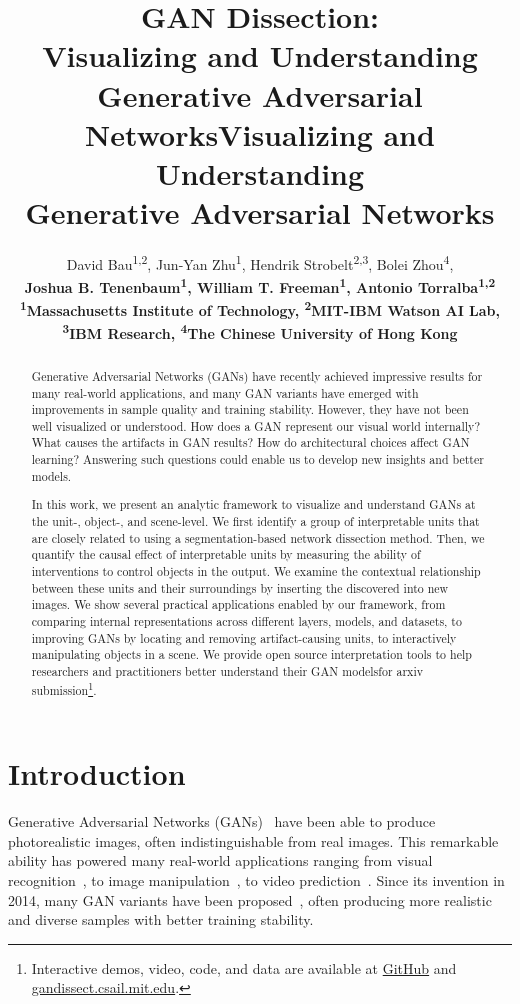 \documentclass{article} %
\title{GAN Dissection: \\ Visualizing and Understanding \\ Generative Adversarial Networks}
\title{Visualizing and Understanding \\ Generative Adversarial Networks}
\author{%
David Bau\textsuperscript{1,2},
Jun-Yan Zhu\textsuperscript{1},
Hendrik Strobelt\textsuperscript{2,3},
Bolei Zhou\textsuperscript{4}, \\
\bf{Joshua B. Tenenbaum}\textsuperscript{1},
\bf{William T. Freeman}\textsuperscript{1},
\bf{Antonio Torralba}\textsuperscript{1,2} \\
\textsuperscript{1}Massachusetts Institute of Technology,
\textsuperscript{2}MIT-IBM Watson AI Lab, \\
\textsuperscript{3}IBM Research,
\textsuperscript{4}The Chinese University of Hong Kong
 }
\author{}
\def\arxiv{for arxiv submission}
\begin{document}
\maketitle

\begin{abstract}
Generative Adversarial Networks (GANs) have recently achieved impressive results for many real-world applications, and many GAN variants have emerged with improvements in sample quality and training stability. However, they have not been well visualized or understood. How does a GAN represent our visual world internally?  What causes the artifacts in GAN results?  How do architectural choices affect GAN learning?  Answering such questions could enable us to develop new insights and better models.

In this work, we present an analytic framework to visualize and understand GANs at the unit-, object-, and scene-level. We first identify a group of interpretable units that are closely related to \concepts using a segmentation-based network dissection method. Then, we quantify the causal effect of interpretable units by measuring the ability of interventions to control objects in the output. We examine the contextual relationship between these units and their surroundings by inserting the discovered \concepts into new images. We show several practical applications enabled by our framework, from comparing internal representations across different layers, models, and datasets, to improving GANs by locating and removing artifact-causing units, to interactively manipulating objects in a scene.  We provide open source interpretation tools to help researchers and practitioners better understand their GAN models\ifdefined\arxiv\footnote{Interactive demos, video, code, and data are available at \href{https://github.com/CSAILVision/gandissect}{GitHub} and \href{https://gandissect.csail.mit.edu}{gandissect.csail.mit.edu}.}\fi.

\end{abstract}
\section{Introduction}
Generative Adversarial Networks (GANs)~\citep{goodfellow2014generative} have been able to produce photorealistic images, often indistinguishable from real images.
This remarkable ability has powered   many real-world applications ranging from visual recognition~\citep{wang2017fast}, to image manipulation~\citep{isola2017image,zhu2017unpaired}, to video prediction~\citep{mathieu2016deep}. Since its invention in 2014, many GAN variants have been proposed~\citep{radford2015unsupervised,zhang2018self}, often producing more realistic and diverse samples with better training stability.
\end{document}
